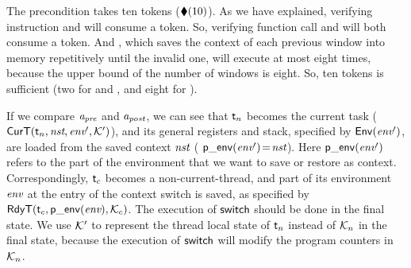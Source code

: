 The precondition takes ten tokens ($\blacklozenge({10})$). 
As we have explained, verifying instruction \call{} 
and \jmp{} will consume a token. 
So, verifying function call
\regsave{} and \regrestore{} will 
both consume a token. And \SaveUsedWin{}, 
which saves the context of each previous window 
into memory repetitively until the invalid one,  
will execute at most eight times, 
because the upper bound of 
the number of windows is eight. 
So, ten tokens is sufficient (two for \regsave{} and 
\regrestore{}, and eight for \SaveUsedWin{}). 

If we compare $\textit{a}_\textit{pre}$ and $\textit{a}_\textit{post}$, we can see that
$\textsf{t}_n$ becomes the current task
($\textsf{CurT}({\textsf{t}_n}, {\textit{nst}}, {\textit{env}'}, {\mathcal{K}'})$),
and its general registers and stack, specified by
$\mathsf{Env}({\textit{env}'})$, are loaded from the saved context
$\textit{nst}$ (\ie{} $\mathsf{p\_env}({\textit{env}'})\!=\!\textit{nst}$).
Here $\mathsf{p\_env}({\textit{env}'})$ refers to the part of the environment
that we want to save or restore as context.
Correspondingly, $\textsf{t}_c$ becomes a non-current-thread,
and part of its environment $\textit{env}$ at the entry of
the context switch is saved, as specified by
$\textsf{RdyT}({\textsf{t}_c}, {\mathsf{p\_env}({\textit{env}})}, {\mathcal{K}_c})$. 
The execution of $\mathsf{switch}$ should be done in the final state. 
We use $\mathcal{K}'$ to represent the thread local 
state of $\textsf{t}_n$ instead of $\mathcal{K}_n$ 
in the final state, because the execution of 
$\mathsf{switch}$ will modify the program counters 
in $\mathcal{K}_n$. 

